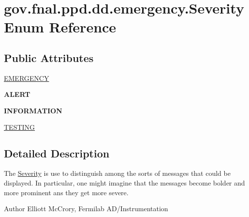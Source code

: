 \hypertarget{enumgov_1_1fnal_1_1ppd_1_1dd_1_1emergency_1_1Severity}{\section{gov.\-fnal.\-ppd.\-dd.\-emergency.\-Severity Enum Reference}
\label{enumgov_1_1fnal_1_1ppd_1_1dd_1_1emergency_1_1Severity}
}
\subsection*{Public Attributes}
\begin{DoxyCompactItemize}
\item 
\hyperlink{enumgov_1_1fnal_1_1ppd_1_1dd_1_1emergency_1_1Severity_a611bc0cf1463a7419a9d2cd14c683578}{E\-M\-E\-R\-G\-E\-N\-C\-Y}
\item 
\hypertarget{enumgov_1_1fnal_1_1ppd_1_1dd_1_1emergency_1_1Severity_ab2b0f7c4e6222e22432f49393a71091c}{{\bfseries A\-L\-E\-R\-T}}\label{enumgov_1_1fnal_1_1ppd_1_1dd_1_1emergency_1_1Severity_ab2b0f7c4e6222e22432f49393a71091c}

\item 
\hypertarget{enumgov_1_1fnal_1_1ppd_1_1dd_1_1emergency_1_1Severity_aaf755550765aa7e569baf503397ecd12}{{\bfseries I\-N\-F\-O\-R\-M\-A\-T\-I\-O\-N}}\label{enumgov_1_1fnal_1_1ppd_1_1dd_1_1emergency_1_1Severity_aaf755550765aa7e569baf503397ecd12}

\item 
\hyperlink{enumgov_1_1fnal_1_1ppd_1_1dd_1_1emergency_1_1Severity_ac5e5ede059fb831322252943bb24a7d5}{T\-E\-S\-T\-I\-N\-G}
\end{DoxyCompactItemize}


\subsection{Detailed Description}
The \hyperlink{enumgov_1_1fnal_1_1ppd_1_1dd_1_1emergency_1_1Severity}{Severity} is use to distinguish among the sorts of messages that could be displayed. In particular, one might imagine that the messages become bolder and more prominent ans they get more severe.

\begin{DoxyAuthor}{Author}
Elliott Mc\-Crory, Fermilab A\-D/\-Instrumentation 
\end{DoxyAuthor}


